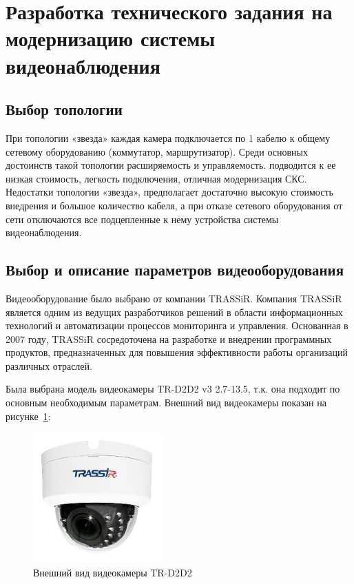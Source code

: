 \section{Разработка технического задания на модернизацию системы видеонаблюдения}

\subsection{Выбор топологии}

При топологии «звезда» каждая камера подключается по 1 кабелю к общему сетевому оборудованию (коммутатор, маршрутизатор).
Среди основных достоинств такой топологии расширяемость и управляемость. подводится к ее низкая стоимость, легкость подключения, отличная модернизация СКС.
Недостатки топологии «звезда», предполагает достаточно высокую стоимость внедрения и большое количество кабеля, а при отказе сетевого оборудования от сети 
отключаются все подцепленные к нему устройства системы видеонаблюдения.

\subsection{Выбор и описание параметров видеооборудования}

Видеооборудование было выбрано от компании TRASSiR\@.
Компания TRASSiR является одним из ведущих разработчиков решений в области информационных технологий и автоматизации процессов мониторинга и управления.
Основанная в 2007 году, TRASSiR сосредоточена на разработке и внедрении программных продуктов, предназначенных для повышения эффективности работы организаций различных отраслей.

\newpage

Была выбрана модель видеокамеры TR-D2D2 v3 2.7-13.5, т.к. она подходит по основным необходимым параметрам.
Внешний вид видеокамеры показан на рисунке~\ref{fig::tr-d2d2}:

\begin{figure}[h]
    \begin{center}
        \includegraphics[width=50mm]{images/TR-D2D2}
    \end{center}
    \captionsetup{justification=centering}
    \caption{Внешний вид видеокамеры TR-D2D2}
    \label{fig::tr-d2d2}
\end{figure}

